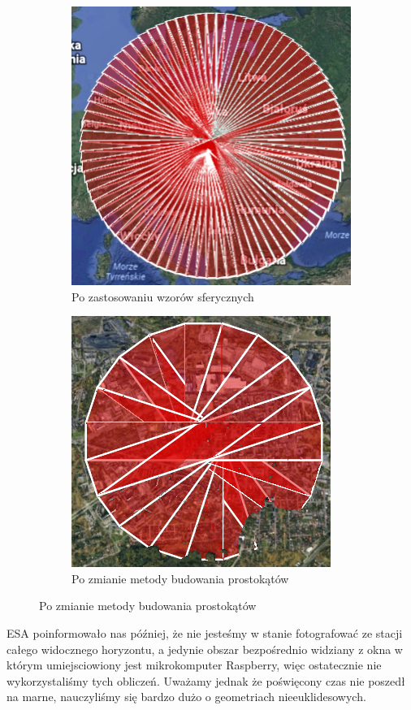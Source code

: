 \begin{figure}[H]
    \begin{subfigure}{0.5\textwidth}
        \centering
        \includegraphics[width=0.9\linewidth]{photos/method3.png}
        \caption{Po zastosowaniu wzorów sferycznych}
    \end{subfigure}
    \begin{subfigure}{0.5\textwidth}
        \centering
        \includegraphics[width=0.9\linewidth]{photos/method4.png}
        \caption{Po zmianie metody budowania prostokątów}
    \end{subfigure}
\end{figure}

ESA poinformowało nas później, że nie jesteśmy w stanie fotografować ze stacji całego widocznego
horyzontu, a jedynie obszar bezpośrednio widziany z okna w którym umiejsciowiony jest mikrokomputer
Raspberry, więc ostatecznie nie wykorzystaliśmy tych obliczeń. Uważamy jednak że poświęcony czas
nie poszedł na marne, nauczyliśmy się bardzo dużo o geometriach nieeuklidesowych.
